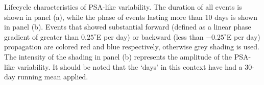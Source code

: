 \label{fig:lifecycle}
Lifecycle characteristics of PSA-like variability. The duration of all events is shown in panel (a), while the phase of events lasting more than 10 days is shown in panel (b). Events that showed substantial forward (defined as a linear phase gradient of greater than $0.25^{\circ}$E per day) or backward (less than $-0.25^{\circ}$E per day) propagation are colored red and blue respectively, otherwise grey shading is used. The intensity of the shading in panel (b) represents the amplitude of the PSA-like variability. It should be noted that the `days' in this context have had a 30-day running mean applied.

